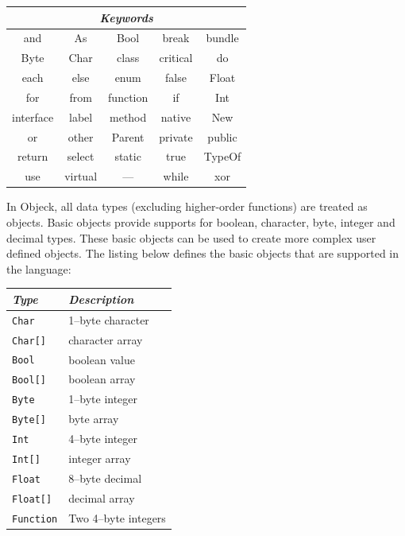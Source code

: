 \documentclass[12pt]{article}
\begin{document}
\begin{center}
  \begin{tabular}{ | c | c | c | c | c | }
    \hline
    \multicolumn{5}{|c|}{\emph{Keywords}} \\ \hline \hline
    and & As & Bool & break & bundle \\ \hline
    Byte & Char & class & critical & do \\ \hline
    each & else & enum & false & Float \\ \hline
    for & from & function & if & Int \\ \hline
    interface & label & method & native & New \\ \hline
    or & other & Parent & private & public \\ \hline
    return & select & static & true & TypeOf \\ \hline
    use & virtual & --- & while & xor \\ \hline
  \end{tabular}
\end{center}

In Objeck, all data types (excluding higher-order functions) are
treated as objects. Basic objects provide supports for boolean,
character, byte, integer and decimal types.  These basic objects can
be used to create more complex user defined objects.  The listing
below defines the basic objects that are supported in the language:

\begin{center}
  \begin{tabular}{| l | l |}
    \hline
    \emph{Type} & \emph{Description} \\ \hline \hline
    \texttt{Char} &  1--byte character \\ \hline
    \texttt{Char[]} &  character array \\ \hline
    \texttt{Bool} &  boolean value \\ \hline
    \texttt{Bool[]} &  boolean array \\ \hline
    \texttt{Byte} &  1--byte integer \\ \hline
    \texttt{Byte[]} &  byte array \\ \hline
    \texttt{Int} &  4--byte integer \\ \hline
    \texttt{Int[]} &  integer array \\ \hline
    \texttt{Float} &  8--byte decimal \\ \hline
    \texttt{Float[]} &  decimal array \\ \hline
    \texttt{Function} &  Two 4--byte integers \\ \hline
  \end{tabular}
\end{center}
\end{document}
